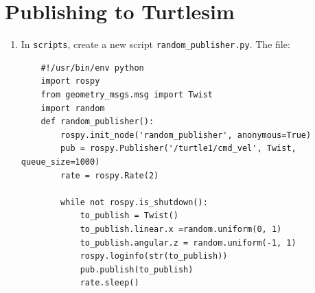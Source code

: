\documentclass{article}
\begin{document}
    \section{Publishing to Turtlesim}
    \begin{enumerate}
        \item In \texttt{scripts}, create a new script \texttt{random\_publisher.py}. The file:
        \begin{verbatim}
    #!/usr/bin/env python
    import rospy
    from geometry_msgs.msg import Twist
    import random
    def random_publisher():
        rospy.init_node('random_publisher', anonymous=True)
        pub = rospy.Publisher('/turtle1/cmd_vel', Twist, queue_size=1000)
        rate = rospy.Rate(2)

        while not rospy.is_shutdown():
            to_publish = Twist()
            to_publish.linear.x =random.uniform(0, 1)
            to_publish.angular.z = random.uniform(-1, 1)
            rospy.loginfo(str(to_publish))
            pub.publish(to_publish)
            rate.sleep()


\end{verbatim}
\end{enumerate}
\end{document}
